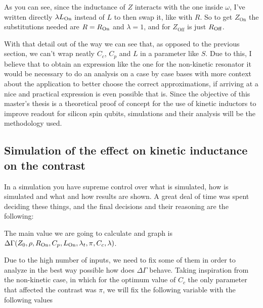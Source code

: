 \documentclass[../main.tex]{subfiles}
\begin{document}
As you can see, since the inductance of \(Z\) interacts with the one inside
\(\omega\), I've written directly \(\lambda L_{\text{On}}\) instead of \(L\) to then
swap it, like with \(R\). So to get \(Z_{\text{On}}\) the substitutions needed
are \(R = R_{\text{On}}\) and \(\lambda = 1\), and for \(Z_{\text{Off}}\) is
just \(R_{\text{Off}}\).

With that detail out of the way we can see that, as opposed to the previous section,
we can't wrap neatly \(C_{c}\), \(C_{p}\) and \(L\) in a parameter like \(S\).
Due to this, I believe that to obtain an expression like the one for the non-kinetic resonator it would be necessary to do an analysis on a case by case bases
with more context about the application to better choose the correct approximations,
if arriving at a nice and practical expression is even possible that is. Since
the objective of this master's thesis is a theoretical proof of concept for the
use of kinetic inductors to improve readout for silicon spin qubits, simulations
and their analysis will be the methodology used.

\subsection{Simulation of the effect on kinetic inductance on the contrast}
In a simulation you have supreme control over what is simulated, how is
simulated and what and how results are shown. A great deal of time was spent
deciding these things, and the final decisions and their reasoning are the following:

The main value we are going to calculate and graph is
\(\Delta\Gamma(Z_{0}, \rho, R_{\text{On}}, C_{p}, L_{\text{On}}, \lambda_{t}, \pi, C_{c}, \lambda)\).

Due to the high number of inputs, we need to fix some of them in order to analyze
in the best way possible how does \(\Delta\Gamma\) behave. Taking inspiration
from the non-kinetic case, in which for the optimum value of \(C_{c}\) the
only parameter that affected the contrast was \(\pi\), we will fix the following
variable with the following values

\end{document}
